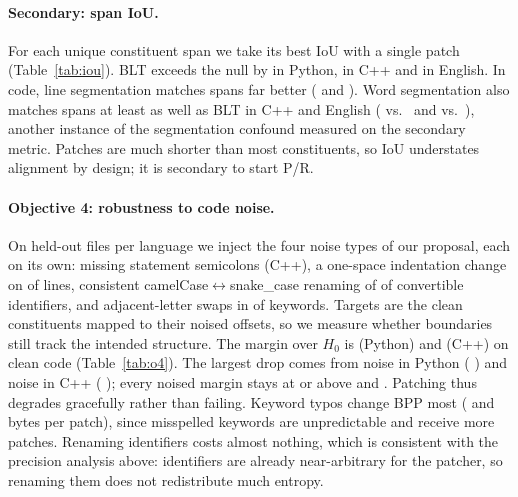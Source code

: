 \TableIoU
\paragraph{Secondary: span IoU.} For each unique constituent span we take its best IoU with a single patch (Table~\ref{tab:iou}). BLT exceeds the null by \IouVsNullPy{} \IouVsNullCIPy{} in Python, \IouVsNullCpp{} \IouVsNullCICpp{} in C++ and \IouVsNullEn{} \IouVsNullCIEn{} in English. In code, line segmentation matches spans far better (\IouLinePy{} and \IouLineCpp{}). Word segmentation also matches spans at least as well as BLT in C++ and English (\IouWordCpp{} vs.\ \IouBltCpp{} and \IouWordEn{} vs.\ \IouBltEn{}), another instance of the segmentation confound measured on the secondary metric. Patches are much shorter than most constituents, so IoU understates alignment by design; it is secondary to start P/R.

\TableOFour
\paragraph{Objective 4: robustness to code noise.} On \OFourFiles{} held-out files per language we inject the four noise types of our proposal, each on its own: missing statement semicolons (C++), a one-space indentation change on \OFourRate{} of lines, consistent camelCase$\leftrightarrow$snake\_case renaming of \OFourCaseRate{} of convertible identifiers, and adjacent-letter swaps in \OFourRate{} of keywords. Targets are the clean constituents mapped to their noised offsets, so we measure whether boundaries still track the intended structure. The margin over $H_0$ is \OFourCleanPy{} (Python) and \OFourCleanCpp{} (C++) on clean code (Table~\ref{tab:o4}). The largest drop comes from \OFourWorstPy{} noise in Python (\OFourWorstDmPy{} \OFourWorstDmCIPy{}) and \OFourWorstCpp{} noise in C++ (\OFourWorstDmCpp{} \OFourWorstDmCICpp{}); every noised margin stays at or above \OFourMinMarginPy{} and \OFourMinMarginCpp{}. Patching thus degrades gracefully rather than failing. Keyword typos change BPP most (\OFourDbppPyTypo{} and \OFourDbppCppTypo{} bytes per patch), since misspelled keywords are unpredictable and receive more patches. Renaming identifiers costs almost nothing, which is consistent with the precision analysis above: identifiers are already near-arbitrary for the patcher, so renaming them does not redistribute much entropy.

